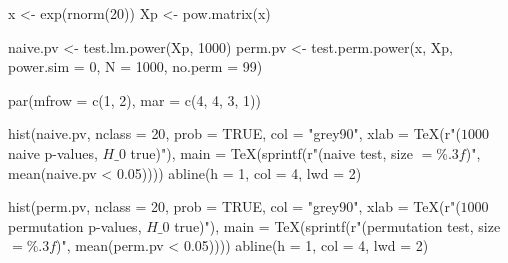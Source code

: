 \documentclass[
  letterpaper,
  DIV=11,
  numbers=noendperiod]{scrreprt}
\newenvironment{Shaded}{\begin{snugshade}}{\end{snugshade}}
\newcommand{\AttributeTok}[1]{\textcolor[rgb]{0.40,0.45,0.13}{#1}}
\newcommand{\ConstantTok}[1]{\textcolor[rgb]{0.56,0.35,0.01}{#1}}
\newcommand{\DecValTok}[1]{\textcolor[rgb]{0.68,0.00,0.00}{#1}}
\newcommand{\FloatTok}[1]{\textcolor[rgb]{0.68,0.00,0.00}{#1}}
\newcommand{\FunctionTok}[1]{\textcolor[rgb]{0.28,0.35,0.67}{#1}}
\newcommand{\NormalTok}[1]{\textcolor[rgb]{0.00,0.23,0.31}{#1}}
\newcommand{\OtherTok}[1]{\textcolor[rgb]{0.00,0.23,0.31}{#1}}
\newcommand{\SpecialCharTok}[1]{\textcolor[rgb]{0.37,0.37,0.37}{#1}}
\newcommand{\StringTok}[1]{\textcolor[rgb]{0.13,0.47,0.30}{#1}}
\begin{document}
\begin{Shaded}
\begin{Highlighting}[]
\NormalTok{x }\OtherTok{\textless{}{-}} \FunctionTok{exp}\NormalTok{(}\FunctionTok{rnorm}\NormalTok{(}\DecValTok{20}\NormalTok{))}
\NormalTok{Xp }\OtherTok{\textless{}{-}} \FunctionTok{pow.matrix}\NormalTok{(x)}

\NormalTok{naive.pv }\OtherTok{\textless{}{-}} \FunctionTok{test.lm.power}\NormalTok{(Xp, }\DecValTok{1000}\NormalTok{)}
\NormalTok{perm.pv }\OtherTok{\textless{}{-}} \FunctionTok{test.perm.power}\NormalTok{(x, Xp, }\AttributeTok{power.sim =} \DecValTok{0}\NormalTok{, }\AttributeTok{N =} \DecValTok{1000}\NormalTok{, }\AttributeTok{no.perm =} \DecValTok{99}\NormalTok{)}

\FunctionTok{par}\NormalTok{(}\AttributeTok{mfrow =} \FunctionTok{c}\NormalTok{(}\DecValTok{1}\NormalTok{, }\DecValTok{2}\NormalTok{), }\AttributeTok{mar =} \FunctionTok{c}\NormalTok{(}\DecValTok{4}\NormalTok{, }\DecValTok{4}\NormalTok{, }\DecValTok{3}\NormalTok{, }\DecValTok{1}\NormalTok{))}

\FunctionTok{hist}\NormalTok{(naive.pv, }\AttributeTok{nclass =} \DecValTok{20}\NormalTok{, }\AttributeTok{prob =} \ConstantTok{TRUE}\NormalTok{, }\AttributeTok{col =} \StringTok{"grey90"}\NormalTok{,}
     \AttributeTok{xlab =} \FunctionTok{TeX}\NormalTok{(r}\StringTok{"($1000$ naive p{-}values, $H\_0$ true)"}\NormalTok{),}
     \AttributeTok{main =} \FunctionTok{TeX}\NormalTok{(}\FunctionTok{sprintf}\NormalTok{(r}\StringTok{"(naive test, size $= \%.3f$)"}\NormalTok{, }\FunctionTok{mean}\NormalTok{(naive.pv }\SpecialCharTok{\textless{}} \FloatTok{0.05}\NormalTok{))))}
\FunctionTok{abline}\NormalTok{(}\AttributeTok{h =} \DecValTok{1}\NormalTok{, }\AttributeTok{col =} \DecValTok{4}\NormalTok{, }\AttributeTok{lwd =} \DecValTok{2}\NormalTok{)}

\FunctionTok{hist}\NormalTok{(perm.pv, }\AttributeTok{nclass =} \DecValTok{20}\NormalTok{, }\AttributeTok{prob =} \ConstantTok{TRUE}\NormalTok{, }\AttributeTok{col =} \StringTok{"grey90"}\NormalTok{,}
     \AttributeTok{xlab =} \FunctionTok{TeX}\NormalTok{(r}\StringTok{"($1000$ permutation p{-}values, $H\_0$ true)"}\NormalTok{),}
     \AttributeTok{main =} \FunctionTok{TeX}\NormalTok{(}\FunctionTok{sprintf}\NormalTok{(r}\StringTok{"(permutation test, size $= \%.3f$)"}\NormalTok{, }\FunctionTok{mean}\NormalTok{(perm.pv }\SpecialCharTok{\textless{}} \FloatTok{0.05}\NormalTok{))))}
\FunctionTok{abline}\NormalTok{(}\AttributeTok{h =} \DecValTok{1}\NormalTok{, }\AttributeTok{col =} \DecValTok{4}\NormalTok{, }\AttributeTok{lwd =} \DecValTok{2}\NormalTok{)}
\end{Highlighting}
\end{Shaded}
\end{document}
